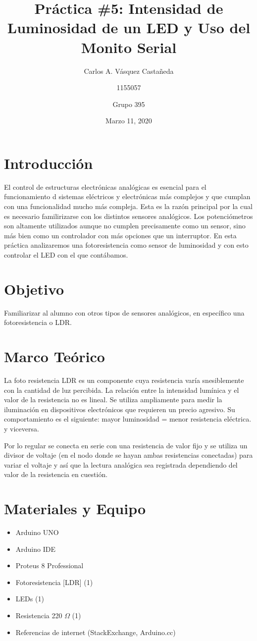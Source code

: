 \documentclass[12pt, letterpaper]{article}
\title{Práctica \#5: Intensidad de Luminosidad de un LED y Uso del Monito Serial}
\author{Carlos A. Vásquez Castañeda \and 1155057 \and Grupo 395}
\date{Marzo 11, 2020}
\begin{document}
\maketitle
\section*{Introducción}
El control de estructuras electrónicas analógicas es esencial para el funcionamiento d sistemas eléctricos y electrónicas más complejos y que cumplan con una funcionalidad mucho más compleja. Esta es la razón principal por la cual es necesario familirizarse con los distintos sensores analógicos. Los potenciómetros son altamente utilizados aunque no cumplen precisamente como un sensor, sino más bien como un controlador con más opciones que un interruptor. En esta práctica analizaremos una fotoresistencia como sensor de luminosidad y con esto controlar el LED con el que contábamos.

\section*{Objetivo}
Familiarizar al alumno con otros tipos de sensores analógicos, en específico una fotoresistencia o LDR.

\section*{Marco Teórico}

La foto resistencia LDR es un componente cuya resistencia varía snesiblemente con la cantidad de luz percibida. La relación entre la intensidad lumínica y el valor de la resistencia no es lineal. Se utiliza ampliamente para medir la iluminación en dispositivos electrónicos que requieren un precio agresivo. Su comportamiento es el siguiente: mayor luminosidad = menor resistencia eléctrica. y viceversa.

Por lo regular se conecta en serie con una resistencia de valor fijo y se utiliza un divisor de voltaje (en el nodo donde se hayan ambas resistencias conectadas) para variar el voltaje y así que la lectura analógica sea registrada dependiendo del valor de la resistencia en cuestión.

\section*{Materiales y Equipo}
\begin{itemize}
	\item Arduino UNO
	\item Arduino IDE
	\item Proteus 8 Professional
	\item Fotoresistencia [LDR] (1)
	\item LEDs (1)
	\item Resistencia 220 $\Omega$ (1)
	\item Referencias de internet (StackExchange, Arduino.cc)
\end{itemize}
\end{document}
